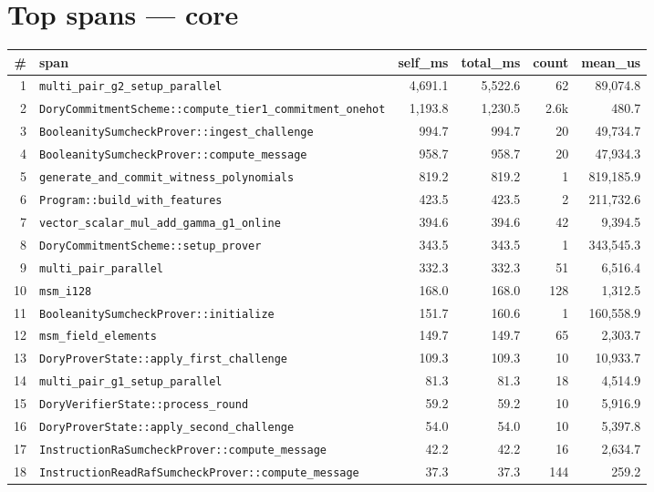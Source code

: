 \documentclass[10pt,a4paper]{article}
\begin{document}
\section{Top spans — core}
\begin{longtable}{r l r r r r}
\toprule \textbf{\#} & \textbf{span} & \textbf{self\_ms} & \textbf{total\_ms} & \textbf{count} & \textbf{mean\_us} \\ \midrule \endhead
1 & \texttt{multi\_pair\_g2\_setup\_parallel} & 4,691.1 & 5,522.6 & 62 & 89,074.8 \\
2 & \texttt{DoryCommitmentScheme::compute\_tier1\_commitment\_onehot} & 1,193.8 & 1,230.5 & 2.6k & 480.7 \\
3 & \texttt{BooleanitySumcheckProver::ingest\_challenge} & 994.7 & 994.7 & 20 & 49,734.7 \\
4 & \texttt{BooleanitySumcheckProver::compute\_message} & 958.7 & 958.7 & 20 & 47,934.3 \\
5 & \texttt{generate\_and\_commit\_witness\_polynomials} & 819.2 & 819.2 & 1 & 819,185.9 \\
6 & \texttt{Program::build\_with\_features} & 423.5 & 423.5 & 2 & 211,732.6 \\
7 & \texttt{vector\_scalar\_mul\_add\_gamma\_g1\_online} & 394.6 & 394.6 & 42 & 9,394.5 \\
8 & \texttt{DoryCommitmentScheme::setup\_prover} & 343.5 & 343.5 & 1 & 343,545.3 \\
9 & \texttt{multi\_pair\_parallel} & 332.3 & 332.3 & 51 & 6,516.4 \\
10 & \texttt{msm\_i128} & 168.0 & 168.0 & 128 & 1,312.5 \\
11 & \texttt{BooleanitySumcheckProver::initialize} & 151.7 & 160.6 & 1 & 160,558.9 \\
12 & \texttt{msm\_field\_elements} & 149.7 & 149.7 & 65 & 2,303.7 \\
13 & \texttt{DoryProverState::apply\_first\_challenge} & 109.3 & 109.3 & 10 & 10,933.7 \\
14 & \texttt{multi\_pair\_g1\_setup\_parallel} & 81.3 & 81.3 & 18 & 4,514.9 \\
15 & \texttt{DoryVerifierState::process\_round} & 59.2 & 59.2 & 10 & 5,916.9 \\
16 & \texttt{DoryProverState::apply\_second\_challenge} & 54.0 & 54.0 & 10 & 5,397.8 \\
17 & \texttt{InstructionRaSumcheckProver::compute\_message} & 42.2 & 42.2 & 16 & 2,634.7 \\
18 & \texttt{InstructionReadRafSumcheckProver::compute\_message} & 37.3 & 37.3 & 144 & 259.2 \\

\end{longtable}
\end{document}
